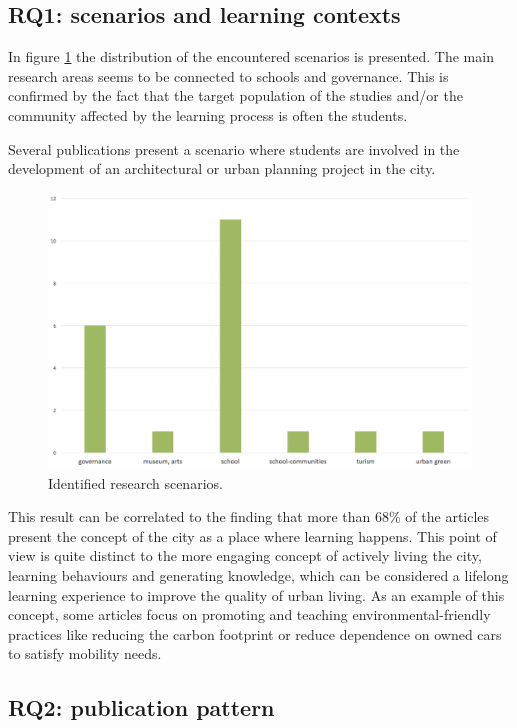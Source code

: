 \subsection*{RQ1: scenarios and learning contexts}

In figure \ref{fig:scenarios} the distribution of the encountered scenarios is presented. The main research areas seems to be connected to schools and governance.
This is confirmed by the fact that the target population of the studies and/or the community affected by the learning process is often the students.

Several publications present a scenario where students are involved in the development of an architectural or urban planning project in the city\cite{seitamaa-hakkarainen_architecture_2012}\cite{ulrich_lets_2013}\cite{beckett_augmented_2005}.

\begin{figure}[htb]
\centering
\includegraphics[width=12cm]{img/scenario}
\caption{Identified research scenarios.}
\label{fig:scenarios}
\end{figure}

This result can be correlated to the finding that more than 68\% of the articles present the concept of the city as a place where learning happens. This point of view is quite distinct to the more engaging concept of actively living the city, learning behaviours and generating knowledge, which can be considered a lifelong learning experience to improve the quality of urban living.
As an example of this concept, some articles focus on promoting and teaching environmental-friendly practices like reducing the carbon footprint\cite{evans_give_2014} or reduce dependence on owned cars to satisfy mobility needs\cite{valle_cloud_2011}.


\subsection*{RQ2: publication pattern}

